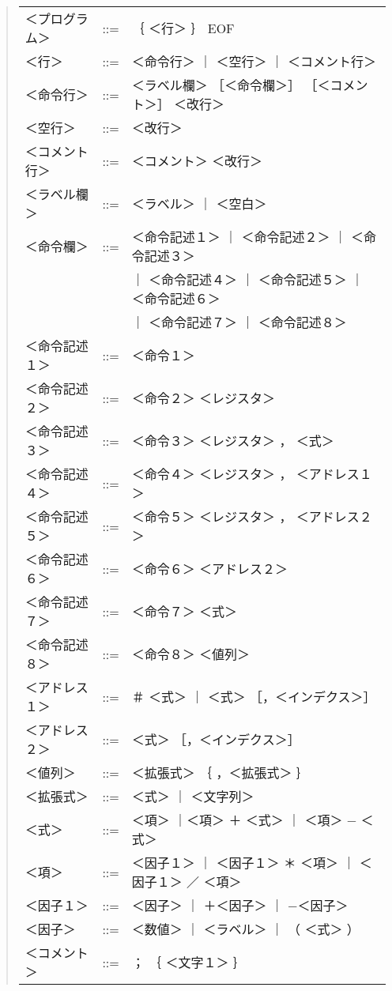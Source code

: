 \begin{quote}
\small\tt\begin{tabular}{lll}
＜プログラム＞& ::= &｛ ＜行＞ ｝ EOF \\
＜行＞        & ::= &＜命令行＞ ｜ ＜空行＞ ｜ ＜コメント行＞ \\
＜命令行＞    & ::= &＜ラベル欄＞ ［＜命令欄＞］ ［＜コメント＞］ ＜改行＞ \\
＜空行＞      & ::= &＜改行＞ \\
＜コメント行＞& ::= &＜コメント＞ ＜改行＞ \\
＜ラベル欄＞  & ::= &＜ラベル＞ ｜ ＜空白＞ \\
＜命令欄＞    & ::= &＜命令記述１＞ ｜ ＜命令記述２＞ ｜ ＜命令記述３＞ \\
              &     &  ｜ ＜命令記述４＞ ｜ ＜命令記述５＞ ｜ ＜命令記述６＞ \\
              &     &  ｜ ＜命令記述７＞ ｜ ＜命令記述８＞ \\
＜命令記述１＞& ::= &＜命令１＞ \\
＜命令記述２＞& ::= &＜命令２＞ ＜レジスタ＞ \\
＜命令記述３＞& ::= &＜命令３＞ ＜レジスタ＞ ， ＜式＞ \\
＜命令記述４＞& ::= &＜命令４＞ ＜レジスタ＞ ， ＜アドレス１＞ \\
＜命令記述５＞& ::= &＜命令５＞ ＜レジスタ＞ ， ＜アドレス２＞ \\
＜命令記述６＞& ::= &＜命令６＞ ＜アドレス２＞ \\
＜命令記述７＞& ::= &＜命令７＞ ＜式＞ \\
＜命令記述８＞& ::= &＜命令８＞ ＜値列＞ \\
＜アドレス１＞& ::= &＃ ＜式＞ ｜ ＜式＞ ［，＜インデクス＞］ \\
＜アドレス２＞& ::= &＜式＞ ［，＜インデクス＞］ \\
＜値列＞      & ::= &＜拡張式＞ ｛ ，＜拡張式＞ ｝ \\
＜拡張式＞    & ::= &＜式＞ ｜ ＜文字列＞ \\
＜式＞        & ::= &＜項＞ ｜＜項＞ ＋ ＜式＞ ｜ ＜項＞ − ＜式＞ \\
＜項＞     & ::= &＜因子１＞ ｜ ＜因子１＞ ＊ ＜項＞ ｜ ＜因子１＞ ／ ＜項＞ \\
＜因子１＞    & ::= &＜因子＞ ｜ ＋＜因子＞ ｜ −＜因子＞ \\
＜因子＞      & ::= &＜数値＞ ｜ ＜ラベル＞ ｜ （ ＜式＞ ） \\
＜コメント＞  & ::= &； ｛ ＜文字１＞ ｝ \\

\end{tabular}
\end{quote}
